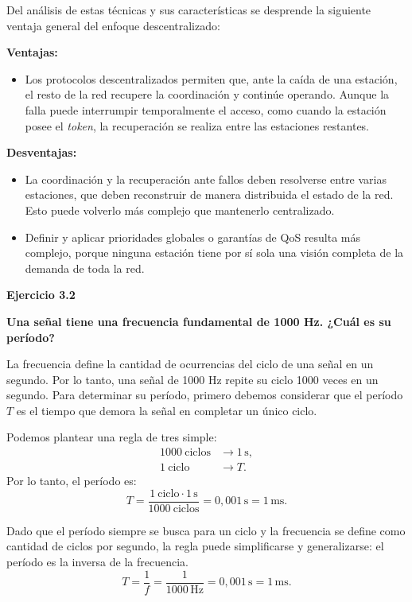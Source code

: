 \documentclass[11pt,a4paper]{article}
\begin{document}
Del análisis de estas técnicas y sus características se desprende la siguiente ventaja general del enfoque descentralizado:

\textbf{Ventajas:}
\begin{itemize}
  \item Los protocolos descentralizados permiten que, ante la caída de una estación, el resto de la red recupere la coordinación y continúe operando. Aunque la falla puede interrumpir temporalmente el acceso, como cuando la estación posee el \textit{token}, la recuperación se realiza entre las estaciones restantes.
\end{itemize}

\textbf{Desventajas:}
\begin{itemize}
  \item La coordinación y la recuperación ante fallos deben resolverse entre varias estaciones, que deben reconstruir de manera distribuida el estado de la red. Esto puede volverlo más complejo que mantenerlo centralizado.
  \item Definir y aplicar prioridades globales o garantías de QoS resulta más complejo, porque ninguna estación tiene por sí sola una visión completa de la demanda de toda la red.
\end{itemize}

\vspace{0.3cm}
\noindent\textbf{Ejercicio 3.2}\par
\noindent\textbf{Una señal tiene una frecuencia fundamental de 1000 Hz. ¿Cuál es su período?}\par
La frecuencia define la cantidad de ocurrencias del ciclo de una señal en un segundo. Por lo tanto, una señal de 1000 Hz repite su ciclo 1000 veces en un segundo. Para determinar su período, primero debemos considerar que el período $T$ es el tiempo que demora la señal en completar un único ciclo.

Podemos plantear una regla de tres simple:
\[
  \begin{aligned}
    1000\ \text{ciclos} &\longrightarrow 1\,\mathrm{s}, \\
    1\ \text{ciclo} &\longrightarrow T.
  \end{aligned}
\]
Por lo tanto, el período es:
\[
  T = \frac{1\ \text{ciclo} \cdot 1\,\mathrm{s}}{1000\ \text{ciclos}} = 0{,}001\,\mathrm{s} = 1\,\mathrm{ms}.
\]

Dado que el período siempre se busca para un ciclo y la frecuencia se define como cantidad de ciclos por segundo, la regla puede simplificarse y generalizarse: el período es la inversa de la frecuencia.
\[
  T = \frac{1}{f} = \frac{1}{1000\,\mathrm{Hz}} = 0{,}001\,\mathrm{s} = 1\,\mathrm{ms}.
\]
\end{document}
